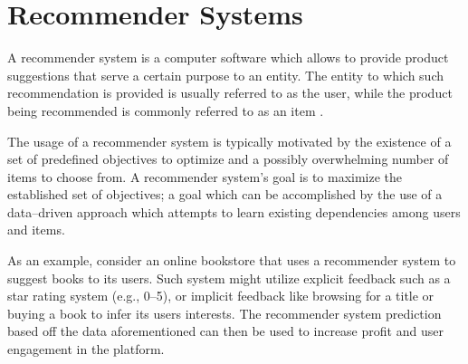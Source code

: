 \section{Recommender Systems} \label{sect:intro:recommender-systems}

A recommender system is a computer software which allows to provide product suggestions that serve a certain purpose to an entity. The entity to which such recommendation is provided is usually referred to as the user, while the product being recommended is commonly referred to as an item \cite{book:rs}.

The usage of a recommender system is typically motivated by the existence of a set of predefined objectives to optimize and a possibly overwhelming number of items to choose from. A recommender system's goal is to maximize the established set of objectives; a goal which can be accomplished by the use of a data--driven approach which attempts to learn existing dependencies among users and items.

As an example, consider an online bookstore that uses a recommender system to suggest books to its users. Such system might utilize explicit feedback such as a star rating system (e.g., 0--5), or implicit feedback like browsing for a title or buying a book to infer its users interests. The recommender system prediction based off the data aforementioned can then be used to increase profit and user engagement in the platform.